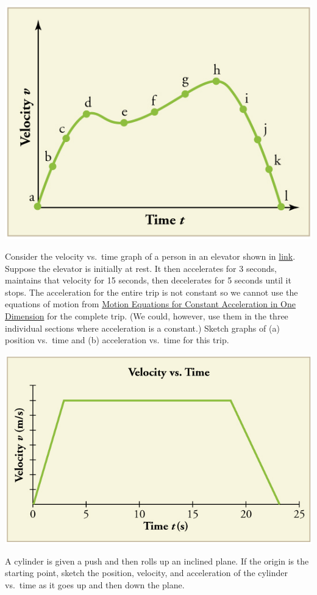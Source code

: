 \documentclass[
]{book}
\newenvironment{conceptual-questions}{}{}
\begin{document}
\begin{conceptual-questions}
\includegraphics{images/Figure_03_08Sol_05.jpg}

\hypertarget{fs-id1365827}{}
\leavevmode\hypertarget{fs-id4021330}{}%
Consider the velocity vs.~time graph of a person in an elevator shown in
\protect\hyperlink{import-auto-id2006890}{link}. Suppose the
elevator is initially at rest. It then accelerates for 3 seconds,
maintains that velocity for 15 seconds, then decelerates for 5 seconds
until it stops. The acceleration for the entire trip is not constant so
we cannot use the equations of motion from \href{/m54773}{Motion Equations for
Constant Acceleration in One Dimension} for the complete trip.
(We could, however, use them in the three individual sections where
acceleration is a constant.) Sketch graphs of (a) position vs.~time and
(b) acceleration vs.~time for this trip.

\includegraphics{images/Figure_03_08Sol_07.jpg}

\hypertarget{fs-id2576953}{}
\leavevmode\hypertarget{fs-id2589937}{}%
A cylinder is given a push and then rolls up an inclined plane. If the
origin is the starting point, sketch the position, velocity, and
acceleration of the cylinder vs.~time as it goes up and then down the
plane.

\end{conceptual-questions}
\end{document}
